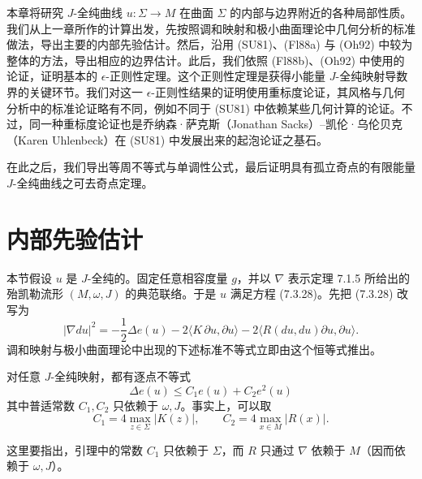 本章将研究 $J$-全纯曲线 $u:\Sigma\to M$ 在曲面 $\Sigma$ 的内部与边界附近的各种局部性质。我们从上一章所作的计算出发，先按照调和映射和极小曲面理论中几何分析的标准做法，导出主要的内部先验估计。然后，沿用 (SU81)、(Fl88a) 与 (Oh92) 中较为整体的方法，导出相应的边界估计。此后，我们依照 (Fl88b)、(Oh92) 中使用的论证，证明基本的 $\epsilon$-正则性定理。这个正则性定理是获得小能量 $J$-全纯映射导数界的关键环节。我们对这一 $\epsilon$-正则性结果的证明使用重标度论证，其风格与几何分析中的标准论证略有不同，例如不同于 (SU81) 中依赖某些几何计算的论证。不过，同一种重标度论证也是乔纳森·萨克斯（Jonathan Sacks）--凯伦·乌伦贝克（Karen Uhlenbeck）在 (SU81) 中发展出来的起泡论证之基石。

在此之后，我们导出等周不等式与单调性公式，最后证明具有孤立奇点的有限能量 $J$-全纯曲线之可去奇点定理。

\section{内部先验估计}
\label{sec:interior-a-priori-estimates}

本节假设 $u$ 是 $J$-全纯的。固定任意相容度量 $g$，并以 $\nabla$ 表示定理 7.1.5 所给出的殆凯勒流形 $(M,\omega,J)$ 的典范联络。于是 $u$ 满足方程 (7.3.28)。先把 (7.3.28) 改写为
\begin{equation}
 |\nabla du|^2=-\frac12\Delta e(u)-2\langle K\,\partial u,\partial u\rangle
 -2\langle R(du,du)\partial u,\partial u\rangle .
 \label{eq:ch8-bochner-rewrite}
\end{equation}
调和映射与极小曲面理论中出现的下述标准不等式立即由这个恒等式推出。

\begin{lemma}\label{lem:ch8-energy-density-differential-ineq}
对任意 $J$-全纯映射，都有逐点不等式
\begin{equation}
 \Delta e(u)\leq C_1e(u)+C_2e^2(u)
 \label{eq:ch8-energy-density-ineq}
\end{equation}
其中普适常数 $C_1,C_2$ 只依赖于 $\omega,J$。事实上，可以取
\begin{equation}
 C_1=4\max_{z\in\Sigma}|K(z)|,\qquad
 C_2=4\max_{x\in M}|R(x)|.
 \label{eq:ch8-density-constants}
\end{equation}
\end{lemma}

这里要指出，引理中的常数 $C_1$ 只依赖于 $\Sigma$，而 $R$ 只通过
$\nabla$ 依赖于 $M$（因而依赖于 $\omega,J$）。

